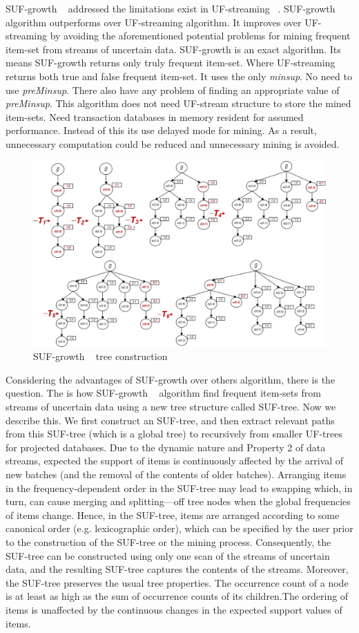 \documentclass[conference]{IEEEtran}
\begin{document}
SUF-growth ~\cite{suf_growth} addressed the limitations exist in UF-streaming ~\cite{suf_growth}. SUF-growth algorithm outperforms over UF-streaming algorithm. It improves over UF-streaming by avoiding the aforementioned potential problems for mining frequent item-set from streams of uncertain data. SUF-growth is an exact algorithm. Its means SUF-growth returns only truly frequent item-set. Where UF-streaming returns both true and false frequent item-set. It uses the only \emph{minsup}. No need to use \emph{preMinsup}. There also have any problem of finding an appropriate value of \emph{preMinsup}. This algorithm does not need UF-stream structure to store the mined item-sets. Need transaction databases in memory resident for assumed performance. Instead of this its use delayed mode for mining. As a result, unnecessary computation could be reduced and unnecessary mining is avoided.
        \begin{figure}[]
        \centering
            \includegraphics[width=.45\textwidth]{images/suf_simulation}
        \caption{SUF-growth ~\cite{suf_growth} tree construction}
        \label{figure:suf_simulation}
        \end{figure}
Considering the advantages of SUF-growth over others algorithm, there is the question. The is how SUF-growth ~\cite{suf_growth} algorithm find frequent item-sets from streams of uncertain data using a new tree structure called SUF-tree. Now we describe this. We ﬁrst construct an SUF-tree, and then extract relevant paths from this SUF-tree (which is a global tree) to recursively from smaller UF-trees for projected databases. Due to the dynamic nature and Property 2 of data streams, expected the support of items is continuously affected by the arrival of new batches (and the removal of the contents of older batches). Arranging items in the frequency-dependent order in the SUF-tree may lead to swapping which, in turn, can cause merging and splitting—off tree nodes when the global frequencies of items change. Hence, in the SUF-tree, items are arranged according to some canonical order (e.g. lexicographic order), which can be speciﬁed by the user prior to the construction of the SUF-tree or the mining process. Consequently, the SUF-tree can be constructed using only one scan of the streams of uncertain data, and the resulting SUF-tree captures the contents of the streams. Moreover, the SUF-tree preserves the usual tree properties. The occurrence count of a node is at least as high as the sum of occurrence counts of its children.The ordering of items is unaffected by the continuous changes in the expected support values of items.\\ \\
\end{document}
